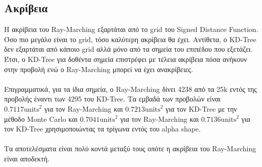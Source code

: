 \documentclass{report}
\begin{document}
\subsection{Ακρίβεια}
Η ακρίβεια του Ray-Marching εξαρτάται από το grid του Signed Distance Function. Όσο πιο μεγάλο είναι το grid, τόσο
καλύτερη ακρίβεια θα έχει. Αντίθετα, ο KD-Tree δεν εξαρτάται από κάποιο grid αλλά μόνο από τα σημεία του επιπέδου που
εξετάζει. Έτσι, ο KD-Tree για δοθέντα σημεία επιστρέφει με τέλεια ακρίβεια πόσα ανήκουν στην προβολή ενώ ο Ray-Marching
μπορεί να έχει ανακρίβειες.
\\\\
Επιγραμματικά, για τα ίδια σημεία, ο Ray-Marching δίνει 4238 από τα 25k εντός της προβολής έναντι των 4295 του KD-Tree.
Τα εμβαδά των προβολών είναι $0.7117 \text{units}^2$ για τον Ray-Marching και $0.7213 \text{units}^2$ για τον KD-Tree 
με την μέθοδο Monte Carlo και $0.7041 \text{units}^2$ για τον Ray-Marching και $0.7136 \text{units}^2$ για τον KD-Tree
χρησιμοποιώντας τα τρίγωνα εντός του alpha shape.
\\\\
Τα αποτελέσματα είναι πολύ κοντά μεταξύ τους οπότε η ακρίβεια του Ray-Marching είναι αποδεκτή.

\clearpage
{}
\end{document}
